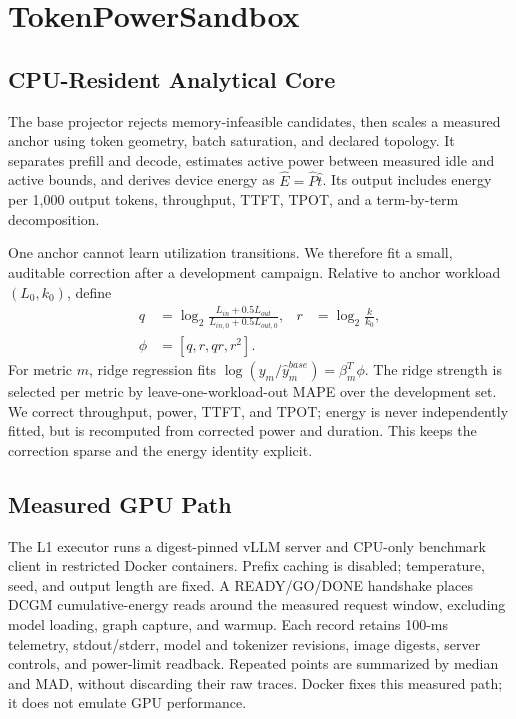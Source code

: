 \section{TokenPowerSandbox}

\subsection{CPU-Resident Analytical Core}

The base projector rejects memory-infeasible candidates, then scales a measured
anchor using token geometry, batch saturation, and declared topology.  It
separates prefill and decode, estimates active power between measured idle and
active bounds, and derives device energy as $\widehat E=\widehat P\widehat t$.
Its output includes energy per 1,000 output tokens, throughput, TTFT, TPOT, and
a term-by-term decomposition.

One anchor cannot learn utilization transitions.  We therefore fit a small,
auditable correction after a development campaign.  Relative to anchor
workload $(L_0,k_0)$, define
\begin{align}
q&=\log_2\!\frac{L_{in}+0.5L_{out}}{L_{in,0}+0.5L_{out,0}},
&r&=\log_2\!\frac{k}{k_0},\\[-3pt]
\phi&=[q,r,qr,r^2].&&
\end{align}
For metric $m$, ridge regression fits
$\log(y_m/\widehat y_m^{base})=\beta_m^T\phi$.  The ridge strength is selected
per metric by leave-one-workload-out MAPE over the development set.  We correct
throughput, power, TTFT, and TPOT; energy is never independently fitted, but is
recomputed from corrected power and duration.  This keeps the correction
sparse and the energy identity explicit.

\subsection{Measured GPU Path}

The L1 executor runs a digest-pinned vLLM server and CPU-only benchmark client
in restricted Docker containers.  Prefix caching is disabled; temperature,
seed, and output length are fixed.  A READY/GO/DONE handshake places DCGM
cumulative-energy reads around the measured request window, excluding model
loading, graph capture, and warmup.  Each record retains 100-ms telemetry,
stdout/stderr, model and tokenizer revisions, image digests, server controls,
and power-limit readback.  Repeated points are summarized by median and MAD,
without discarding their raw traces.  Docker fixes this measured path; it does
not emulate GPU performance.

